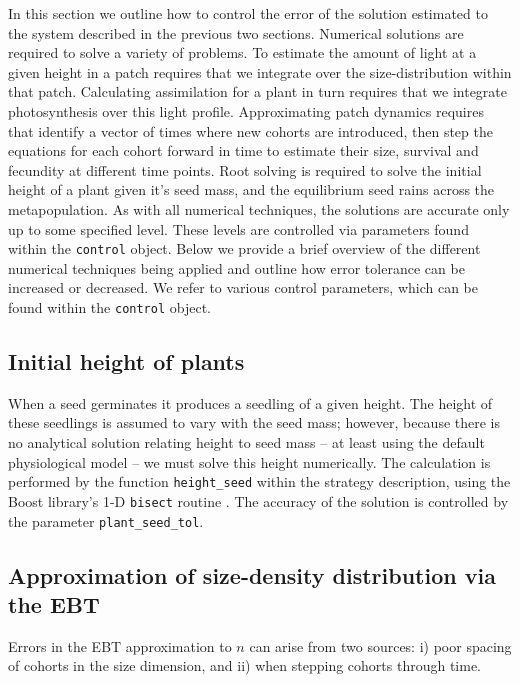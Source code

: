 \documentclass[10pt,twoside]{article}
\begin{document}
In this section we outline how to control the error of the solution
estimated to the system described in the previous two sections.
Numerical solutions are required to solve a variety of problems. To
estimate the amount of light at a given height in a patch requires that
we integrate over the size-distribution within that patch. Calculating
assimilation for a plant in turn requires that we integrate
photosynthesis over this light profile. Approximating patch dynamics
requires that identify a vector of times where new cohorts are
introduced, then step the equations for each cohort forward in time to
estimate their size, survival and fecundity at different time points.
Root solving is required to solve the initial height of a plant given
it's seed mass, and the equilibrium seed rains across the
metapopulation. As with all numerical techniques, the solutions are
accurate only up to some specified level. These levels are controlled
via parameters found within the \texttt{control} object. Below we
provide a brief overview of the different numerical techniques being
applied and outline how error tolerance can be increased or decreased. 
We refer to various control parameters, which can be found within the 
\texttt{control} object. 

\subsection{Initial height of plants}\label{initial-height-of-plants}

When a seed germinates it produces a seedling of a given height. The
height of these seedlings is assumed to vary with the seed mass;
however, because there is no analytical solution relating height to seed
mass -- at least using the default physiological model -- we must solve
this height numerically. The calculation is performed by the function
\texttt{height\_seed} within the strategy description, using the Boost
library's 1-D \texttt{bisect} routine
\citep{Schaling-2014, Eddelbuettel-2015}. The accuracy of the solution
is controlled by the parameter \texttt{plant\_seed\_tol}.

\subsection{Approximation of size-density distribution via the EBT}
\label{approximation-of-size-density-distribution-via-the-ebt}

Errors in the EBT approximation to \(n\) can arise from two sources: i)
poor spacing of cohorts in the size dimension, and ii) when stepping
cohorts through time.
\end{document}
